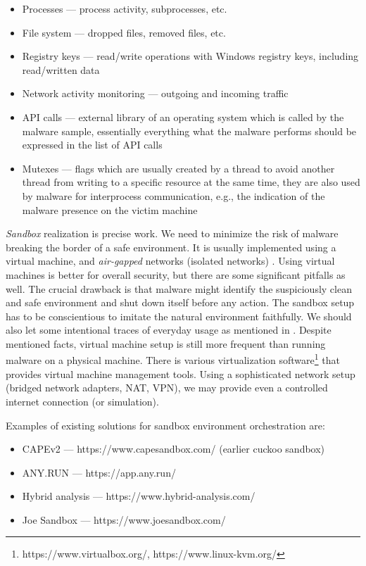 \begin{itemize}
  \itemsep0em 
  \item Processes --- process activity, subprocesses, etc.
  \item File system --- dropped files, removed files, etc.
  \item Registry keys --- read/write operations with Windows registry keys, including read/written data
  \item Network activity monitoring --- outgoing and incoming traffic
  \item API calls --- external library of an operating system which is called by the malware sample, essentially everything what the malware performs should be expressed in the list of API calls
  \item Mutexes --- flags which are usually created by a thread to avoid another thread from writing to a specific resource at the same time, they are also used by malware for interprocess communication, e.g., the indication of the malware presence on the victim machine
\end{itemize}

\emph{Sandbox} realization is precise work. We need to minimize the risk of malware breaking the border of a safe environment. It is usually implemented using a virtual machine, and \emph{air-gapped} networks (isolated networks) \cite{Sikorski2012}. Using virtual machines is better for overall security, but there are some significant pitfalls as well. The crucial drawback is that malware might identify the suspiciously clean and safe environment and shut down itself before any action. The sandbox setup has to be conscientious to imitate the natural environment faithfully. We should also let some intentional traces of everyday usage as mentioned in \cite{CAPESand75:online}. Despite mentioned facts, virtual machine setup is still more frequent than running malware on a physical machine. There is various virtualization software\footnote{https://www.virtualbox.org/, https://www.linux-kvm.org/} that provides virtual machine management tools. Using a sophisticated network setup (bridged network adapters, NAT, VPN), we may provide even a controlled internet connection (or simulation).

Examples of existing solutions for sandbox environment orchestration are:
\begin{itemize}
  \itemsep0em 
  \item CAPEv2 --- https://www.capesandbox.com/ (earlier cuckoo sandbox)
  \item ANY.RUN --- https://app.any.run/
  \item Hybrid analysis --- https://www.hybrid-analysis.com/
  \item Joe Sandbox --- https://www.joesandbox.com/
\end{itemize}

